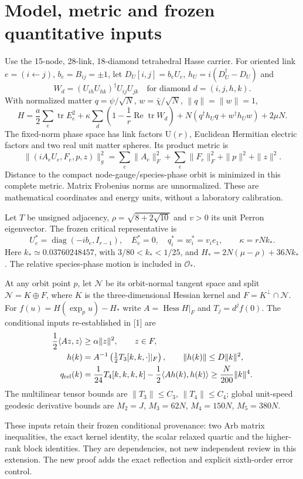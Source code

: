 \documentclass[11pt,a4paper]{article}
\newcommand{\tr}{\operatorname{tr}}\newcommand{\diag}{\operatorname{diag}}\newcommand{\Rea}{\operatorname{Re}}
\begin{document}
\section{Model, metric and frozen quantitative inputs}
Use the 15-node, 28-link, 18-diamond tetrahedral Hasse carrier. For oriented link $e=(i\leftarrow j)$, $b_e=B_{ij}=\pm1$, let $D_U[i,j]=b_eU_e$, $h_U=i(D_U^\dagger-D_U)$ and
\[
W_d=(U_{ih}U_{hk})^\dagger U_{ij}U_{jk}
\quad\text{for diamond }d=(i,j,h,k).
\]
With normalized matter $q=\psi/\sqrt N$, $w=\bar\chi/\sqrt N$, $\|q\|=\|w\|=1$,
\[
H=\frac a2\sum_e\tr E_e^2+\kappa\sum_d\left(1-\frac1r\Rea\tr W_d\right)
+N(q^\dagger h_Uq+w^\dagger h_Uw)+2\mu N.
\]
The fixed-norm phase space has link factors $\mathrm U(r)$, Euclidean Hermitian electric factors and two real unit matter spheres. Its product metric is
\[
\|(iA_eU_e,F_e,p,z)\|_g^2
=\sum_e\|A_e\|_F^2+\sum_e\|F_e\|_F^2+\|p\|^2+\|z\|^2.
\]
Distance to the compact node-gauge/species-phase orbit is minimized in this complete metric. Matrix Frobenius norms are unnormalized. These are mathematical coordinates and energy units, without a laboratory calibration.

Let $T$ be unsigned adjacency, $\rho=\sqrt{8+2\sqrt{10}}$ and $v>0$ its unit Perron eigenvector. The frozen critical representative is
\[
U_e^*=\diag(-ib_e,I_{r-1}),\quad E_e^*=0,\quad q_i^*=w_i^*=v_i e_1,
\qquad \kappa=rNk_*.
\]
Here $k_*\simeq0.03760248457$, with $3/80<k_*<1/25$, and $H_*=2N(\mu-\rho)+36Nk_*$. The relative species-phase motion is included in $\mathcal O_*$.

At any orbit point $p$, let $\mathcal N$ be its orbit-normal tangent space and split $\mathcal N=K\oplus F$, where $K$ is the three-dimensional Hessian kernel and $F=K^\perp\cap\mathcal N$. For $f(u)=H(\exp_pu)-H_*$ write $A=\operatorname{Hess}H|_F$ and $T_j=d^jf(0)$. The conditional inputs re-established in [1] are
\begin{align*}
\frac12\langle Az,z\rangle&\ge\alpha\|z\|^2,\qquad z\in F,\\
h(k)&=A^{-1}\left(\tfrac12T_3[k,k,\cdot]|_F\right),\qquad
\|h(k)\|\le D\|k\|^2,\\
q_{\rm rel}(k)&=\frac1{24}T_4[k,k,k,k]-\frac12\langle Ah(k),h(k)\rangle
\ge\frac N{200}\|k\|^4.
\end{align*}
The multilinear tensor bounds are $\|T_3\|\le C_3$, $\|T_4\|\le C_4$; global unit-speed geodesic derivative bounds are $M_2=J$, $M_3=62N$, $M_4=150N$, $M_5=380N$.

These inputs retain their frozen conditional provenance: two Arb matrix inequalities, the exact kernel identity, the scalar relaxed quartic and the higher-rank block identities. They are dependencies, not new independent review in this extension. The new proof adds the exact reflection and explicit sixth-order error control.
\newpage
\end{document}
